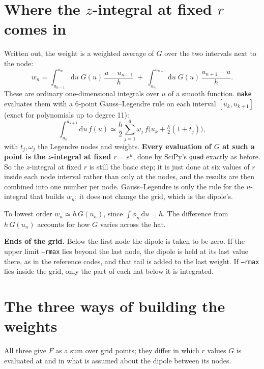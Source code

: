 \documentclass[11pt,a4paper]{article}
\newcommand{\dd}{\mathrm{d}}
\newcommand{\code}[1]{\texttt{\small #1}}
\begin{document}
\section{Where the \texorpdfstring{$z$}{z}-integral at fixed \texorpdfstring{$r$}{r} comes in}
Written out, the weight is a weighted average of $G$ over the two intervals next to the node:
\begin{equation}
w_n=\int_{u_{n-1}}^{u_n}\dd u\;G(u)\,\frac{u-u_{n-1}}{h}\;+\;\int_{u_n}^{u_{n+1}}\dd u\;G(u)\,\frac{u_{n+1}-u}{h}.
\end{equation}
These are ordinary one-dimensional integrals over $u$ of a smooth function. \code{make} evaluates them with a 6-point Gauss--Legendre rule on each interval $[u_k,u_{k+1}]$ (exact for polynomials up to degree 11):
\begin{equation}
\int_{u_k}^{u_{k+1}}\dd u\,f(u)\simeq\frac h2\sum_{j=1}^6\omega_j\,f\Big(u_k+\tfrac h2(1+t_j)\Big),
\end{equation}
with $t_j,\omega_j$ the Legendre nodes and weights. \textbf{Every evaluation of $G$ at such a point is the $z$-integral at fixed $r=e^u$}, done by SciPy's \code{quad} exactly as before. So the $z$-integral at fixed $r$ is still the basic step; it is just done at six values of $r$ inside each node interval rather than only at the nodes, and the results are then combined into one number per node. Gauss--Legendre is only the rule for the $u$-integral that builds $w_n$; it does not change the grid, which is the dipole's.

To lowest order $w_n\simeq h\,G(u_n)$, since $\int\phi_n\,\dd u=h$. The difference from $h\,G(u_n)$ accounts for how $G$ varies across the hat.

\textbf{Ends of the grid.} Below the first node the dipole is taken to be zero. If the upper limit \code{--rmax} lies beyond the last node, the dipole is held at its last value there, as in the reference codes, and that tail is added to the last weight. If \code{--rmax} lies inside the grid, only the part of each hat below it is integrated.

\section{The three ways of building the weights}
All three give $F$ as a sum over grid points; they differ in which $r$ values $G$ is evaluated at and in what is assumed about the dipole between its nodes.
\end{document}
